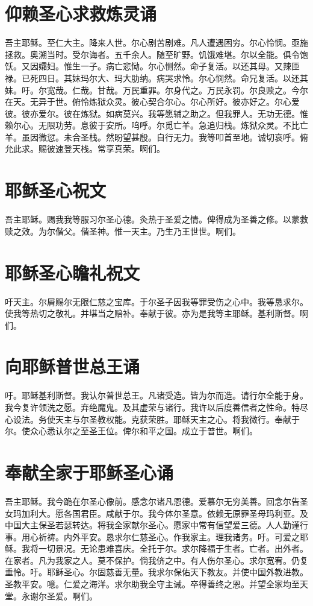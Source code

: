 \documentclass[UTF8,17pt]{ctexart}
\begin{document}
\section{仰赖圣心求救炼灵诵}

吾主耶稣。⾄仁⼤主。降来⼈世。尔⼼剧苦剧难。凡⼈遭遇困穷。尔⼼怜悯。亟施拯救。奥溯当时。受尔诲者。五千余⼈。随⾄旷野。饥饿难堪。尔以全能。俱令饱饫。又因孀妇。惟⽣⼀⼦。病亡悲恸。尔⼼恻然。命⼦复活。以还其母。又辣匝禄。已死四⽇。其妹玛尔⼤、玛⼤肋纳。病哭求怜。尔⼼悯然。命兄复活。以还其妹。吁。尔宽哉。仁哉。⽢哉。万民重罪。尔⾝代之。万民永罚。尔良赎之。今尔在天。⽆异于世。俯怜炼狱众灵。彼⼼契合尔⼼。尔⼼所好。彼亦好之。尔⼼爱彼。彼亦爱尔。彼在炼狱。如病莫兴。我等愿辅之助之。但我罪⼈。⽆功⽆德。惟赖尔⼼。⽆限功劳。息彼于安所。呜呼。尔觅亡⽺。急追归栈。炼狱众灵。不⽐亡⽺。虽因微愆。未合圣栈。然盼望甚殷。⾃⾏⽆⼒。我等叩⾸⾄地。诚切哀呼。俯允此求。赐彼速登天栈。常享真荣。啊们。

\section{耶稣圣⼼祝⽂}

吾主耶稣。赐我我等服习尔圣⼼德。灸热于圣爱之情。俾得成为圣善之修。以蒙救赎之效。为尔偕⽗。偕圣神。惟⼀天主。乃⽣乃王世世。啊们。

\section{耶稣圣心瞻礼祝⽂}

吁天主。尔屑赐尔⽆限仁慈之宝库。于尔圣⼦因我等罪受伤之⼼中。我等恳求尔。使我等热切之敬礼。并堪当之赔补。奉献于彼。亦为是我等主耶稣。基利斯督。啊们。

\section{向耶稣普世总王诵}

吁。耶稣基利斯督。我认尔普世总王。凡诸受造。皆为尔⽽造。请⾏尔全能于⾝。我今复许领洗之愿。弃绝魔⿁。及其虚荣与诸⾏。我许以后度善信者之性命。特尽⼼设法。务使天主与尔圣教权能。克获荣胜。耶稣天主之⼼。将我微⾏。奉献于尔。使众⼼悉认尔之⾄圣王位。俾尔和平之国。成⽴于普世。啊们。

\section{奉献全家于耶稣圣⼼诵}

吾主耶稣。我今跪在尔圣⼼像前。感念尔诸凡恩德。爱慕尔⽆穷美善。回念尔告圣⼥玛加利⼤。愿各国君⾂。咸献于尔。我今体尔圣意。依赖⽆原罪圣母玛利亚。及中国⼤主保圣若瑟转达。将我全家献尔圣⼼。愿家中常有信望爱三德。⼈⼈勤谨⾏事。⽤⼼祈祷。内外平安。恳求尔仁慈圣⼼。作我家主。理我诸务。吁。可爱之耶稣。我将⼀切景况。⽆论患难喜庆。全托于尔。求尔降福于⽣者。亡者。出外者。在家者。凡为我家之⼈。莫不保护。倘我侪之中。有⼈伤尔圣⼼。求尔宽宥。仍复垂怜。吁。耶稣圣⼼。尔固慈善⽆量。我求尔保佑天下教友。并使中国外教进教。圣教平安。噫。仁爱之海洋。求尔助我全守主诫。卒得善终之恩。并望全家均⾄天堂。永谢尔圣爱。啊们。
\end{document}
